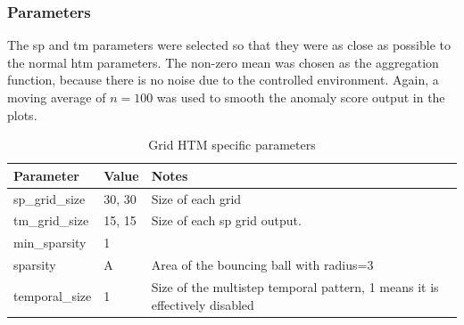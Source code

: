 \subsubsection{Parameters}
The \gls*{sp} and \gls*{tm} parameters were selected so that they were as close as possible to the normal \gls*{htm} parameters. The non-zero mean was chosen as the aggregation function, because there is no noise due to the controlled environment. Again, a moving average of $n=100$ was used to smooth the anomaly score output in the plots.
\begin{table}[H]
    \centering
    \begin{tabularx}{\linewidth}{@{}XlX@{}}
        \toprule
        \textbf{Parameter} & \textbf{Value} & \textbf{Notes}                                                             \\
        \midrule
        sp\_grid\_size     & 30, 30         & Size of each grid                                                          \\
        tm\_grid\_size     & 15, 15         & Size of each \gls*{sp} grid output.                                        \\
        min\_sparsity      & 1              &                                                                            \\
        sparsity           & A              & Area of the bouncing ball with radius=3                                    \\
        temporal\_size     & 1              & Size of the multistep temporal pattern, 1 means it is effectively disabled \\
        \bottomrule
    \end{tabularx}
    \caption{Grid HTM specific parameters}
    \label{tab:bb_gridhtm_params}
\end{table}
